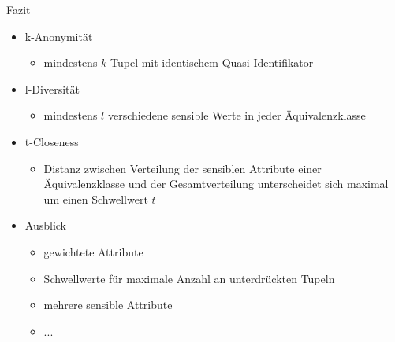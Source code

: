 \begin{frame}{Fazit}
	\begin{itemize}
		\item k-Anonymität
		\begin{itemize}
			\item mindestens $k$ Tupel mit identischem Quasi-Identifikator
		\end{itemize}

		\item l-Diversität
		\begin{itemize}
			\item mindestens $l$ verschiedene sensible Werte in jeder Äquivalenzklasse
		\end{itemize}

		\item t-Closeness
		\begin{itemize}
			\item Distanz zwischen Verteilung der sensiblen Attribute einer Äquivalenzklasse und der Gesamtverteilung unterscheidet sich maximal um einen Schwellwert \(t\)
		\end{itemize}

		\pause

		\item Ausblick
		\begin{itemize}
			\item gewichtete Attribute
			\item Schwellwerte für maximale Anzahl an unterdrückten Tupeln
			\item mehrere sensible Attribute
			\item ...
		\end{itemize}
	\end{itemize}
\end{frame}